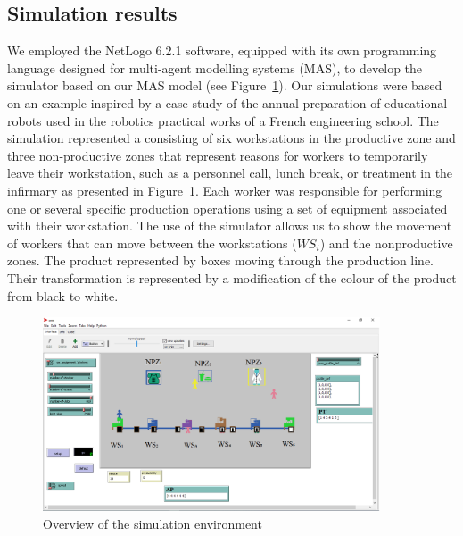 \documentclass[review,12pt, 3p, times]{elsarticle}
\begin{document}
\subsection{Simulation results}
We employed the NetLogo 6.2.1 software, equipped with its own programming language designed for multi-agent modelling systems (MAS), to develop the simulator based on our MAS model (see Figure~\ref{fig:simulator}). Our simulations were based on an example inspired by a case study of the annual preparation of educational robots used in the robotics practical works of a French engineering school.  The simulation represented a  consisting of six workstations in the productive zone and three non-productive zones that represent reasons for workers to temporarily leave their workstation, such as a personnel call, lunch break, or treatment in the infirmary as presented in Figure~\ref{fig:simulator}. Each worker was responsible for performing one or several specific production operations using a set of equipment associated with their workstation. The use of the simulator allows us to show the movement of workers that can move between the workstations ($WS_i$) and the nonproductive zones. The product represented by boxes moving through the production line. Their transformation is represented by a modification of the colour of the product from black to white.
\begin{figure}[htbp]
	\centering
	\includegraphics[width=10cm]{simulation.png}
	\caption{Overview of the simulation environment}
	\label{fig:simulator}
\end{figure}
		
\end{document}
